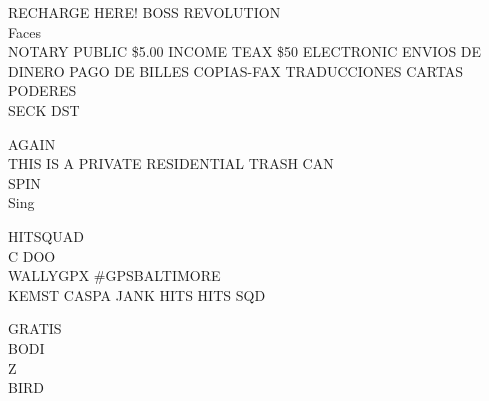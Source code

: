 \documentclass[10pt,letterpaper]{article}
\begin{document}
RECHARGE HERE!  BOSS REVOLUTION\\
Faces\\
NOTARY PUBLIC \$5.00 INCOME TEAX \$50 ELECTRONIC ENVIOS DE DINERO PAGO DE BILLES COPIAS{-}FAX TRADUCCIONES CARTAS PODERES\\
SECK DST

AGAIN\\
THIS IS A PRIVATE RESIDENTIAL TRASH CAN\\
SPIN\\
Sing

HITSQUAD\\
C DOO\\
WALLYGPX \#GPSBALTIMORE\\
KEMST CASPA JANK HITS HITS SQD

GRATIS\\
BODI\\
Z\\
BIRD
\end{document}
